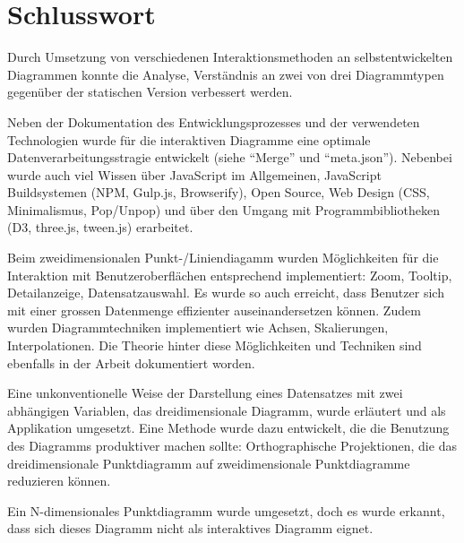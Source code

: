 \chapter{Schlusswort}

Durch Umsetzung von verschiedenen Interaktionsmethoden an selbstentwickelten Diagrammen konnte die Analyse, Verständnis an zwei von drei Diagrammtypen gegenüber der statischen Version verbessert werden.

Neben der Dokumentation des Entwicklungsprozesses und der verwendeten Technologien wurde für die interaktiven Diagramme eine optimale Datenverarbeitungsstragie entwickelt (siehe "`Merge"' und "`meta.json"'). Nebenbei wurde auch viel Wissen über JavaScript im Allgemeinen, JavaScript Buildsystemen (NPM, Gulp.js, Browserify), Open Source, Web Design (CSS, Minimalismus, Pop/Unpop) und über den Umgang mit Programmbibliotheken (D3, three.js, tween.js) erarbeitet.

Beim zweidimensionalen Punkt-/Liniendiagamm wurden Möglichkeiten für die Interaktion mit Benutzeroberflächen entsprechend implementiert: Zoom, Tooltip, Detailanzeige, Datensatzauswahl. Es wurde so auch erreicht, dass Benutzer sich mit einer grossen Datenmenge effizienter auseinandersetzen können. Zudem wurden Diagrammtechniken implementiert wie Achsen, Skalierungen, Interpolationen. Die Theorie hinter diese Möglichkeiten und Techniken sind ebenfalls in der Arbeit dokumentiert worden.

Eine unkonventionelle Weise der Darstellung eines Datensatzes mit zwei abhängigen Variablen, das dreidimensionale Diagramm, wurde erläutert und als Applikation umgesetzt. Eine Methode wurde dazu entwickelt, die die Benutzung des Diagramms produktiver machen sollte: Orthographische Projektionen, die das dreidimensionale Punktdiagramm auf zweidimensionale Punktdiagramme reduzieren können.

Ein N-dimensionales Punktdiagramm wurde umgesetzt, doch es wurde erkannt, dass sich dieses Diagramm nicht als interaktives Diagramm eignet.

